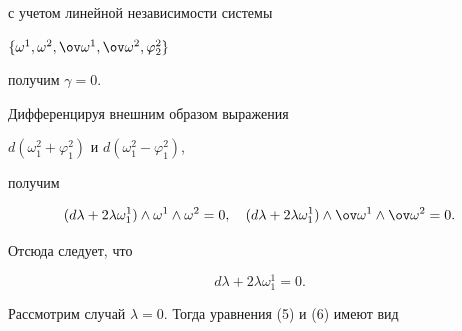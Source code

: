 с учетом линейной независимости системы 


$\{\omega^1,\omega^2,\ov\omega^1,\ov\omega^2,\varphi^2_2\}$ 


получим $\gamma=0$. 


Дифференцируя внешним образом выражения 


$d(\omega^2_1+\varphi^2_1)$ и $d(\omega^2_1-\varphi^2_1)$, 


получим 


$$ 


(d\lambda+2\lambda\omega^1_1)\wedge\omega^1 


\wedge\omega^2=0,\quad 


(d\lambda+2\lambda\omega^1_1)\wedge\ov\omega^1 


\wedge\ov\omega^2=0. 


$$ 


Отсюда следует, что 


\begin{equation} 


d\lambda+2\lambda\omega^1_1=0.


\end{equation} 


 


Рассмотрим случай $\lambda=0$. Тогда уравнения (5) и (6) имеют вид 


